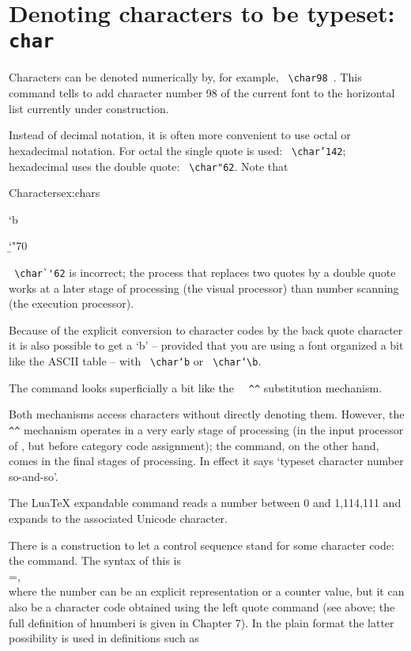 \section{Denoting characters to be typeset: \texttt{char}}

\index{\string\char}
Characters can be denoted numerically by, for example, \verb+ \char98 +. This command tells \tex to add
character number 98 of the current font to the horizontal list currently under construction.

Instead of decimal notation, it is often more convenient to use octal or hexadecimal notation. For
octal the single quote is used: \verb+ \char’142+; hexadecimal uses the double quote: \verb+ \char"62+. Note that

\begin{texexample}{Characters}{ex:chars}
\bgroup
\ttfamily


\char`b

\char`\b

\char"70

\egroup
\end{texexample}

\verb+ \char`'62+  is incorrect; the process that replaces two quotes by a double quote works at a later
stage of processing (the visual processor) than number scanning (the execution processor).

Because of the explicit conversion to character codes by the back quote character it is also possible
to get a ‘b’ – provided that you are using a font organized a bit like the ASCII table – with \verb+ \char‘b+
or \verb+ \char‘\b+.

The \cmd{\char} command looks superficially a bit like the \verb+  ^^+ substitution mechanism.

Both mechanisms access characters without directly denoting them. However, the \verb+ ^^+ mechanism
operates in a very early stage of processing (in the input processor of \tex, but before category
code assignment); the \cmd{\char} command, on the other hand, comes in the final stages of processing.
In effect it says ‘typeset character number so-and-so’.

\CMDI{\Uchar} The LuaTeX expandable command \cmd{\Uchar} reads a number between 0 and 1,114,111 and expands to the
associated Unicode character. 

\DescribeMacro{\chardef}
There is a construction to let a control sequence stand for some character code: the \cmd{\chardef}
command. The syntax of this is\\
=,\\
where the number can be an explicit representation or a counter value, but it can also be a character
code obtained using the left quote command (see above; the full definition of hnumberi is
given in Chapter 7). In the plain format the latter possibility is used in definitions such as

